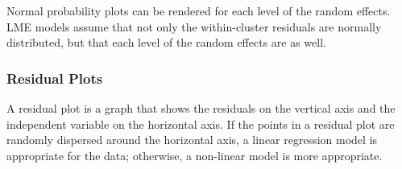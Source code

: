 \documentclass[12pt, a4paper]{report}
\theoremstyle{plain}
\theoremstyle{definition}
\theoremstyle{remark}
\begin{document}
Normal probability plots can be rendered for each level of the random effects.  LME models assume that not only the within-cluster residuals are normally distributed, but that each level of the random effects are as well. %
	
	
	
	
	
	
	
	
	
	
	
	
	
	
	
	
	
	\subsubsection{Residual Plots}
	A residual plot is a graph that shows the residuals on the vertical axis and the independent variable on the horizontal axis. If the points in a residual plot are randomly dispersed around the horizontal axis, a linear regression model is appropriate for the data; otherwise, a non-linear model is more appropriate.
	
	
\end{document}
